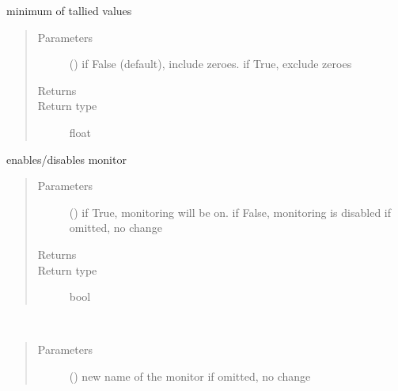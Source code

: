 \documentclass[letterpaper,10pt,english]{sphinxmanual}
\begin{document}
\begin{fulllineitems}
\begin{fulllineitems}
\label{\detokenize{Reference:salabim.Monitor.minimum}}
minimum of tallied values
\begin{quote}\begin{description}
\item[{Parameters}] \leavevmode
{} () \textendash{} if False (default), include zeroes. if True, exclude zeroes

\item[{Returns}] \leavevmode
{}

\item[{Return type}] \leavevmode
float

\end{description}\end{quote}

\end{fulllineitems}


\begin{fulllineitems}
\label{\detokenize{Reference:salabim.Monitor.monitor}}
enables/disables monitor
\begin{quote}\begin{description}
\item[{Parameters}] \leavevmode
{} () \textendash{} if True, monitoring will be on. 
if False, monitoring is disabled 
if omitted, no change

\item[{Returns}] \leavevmode
{}

\item[{Return type}] \leavevmode
bool

\end{description}\end{quote}

\end{fulllineitems}


\begin{fulllineitems}
\label{\detokenize{Reference:salabim.Monitor.name}}~\begin{quote}\begin{description}
\item[{Parameters}] \leavevmode
{} () \textendash{} new name of the monitor
if omitted, no change


\end{description}
\end{quote}
\end{fulllineitems}
\end{fulllineitems}
\end{document}
